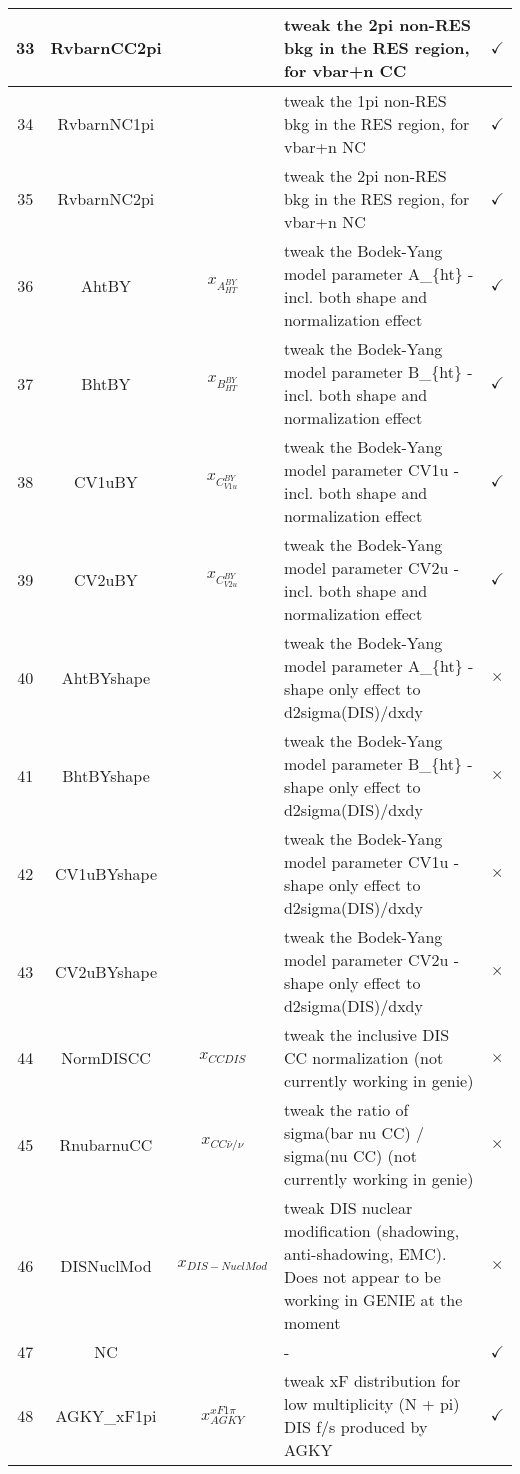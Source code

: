 \begin{longtable}{|c|c|c|X|c|}
\hline
33 & RvbarnCC2pi && tweak the 2pi non-RES bkg in the RES region, for vbar+n CC & $\checkmark$\\
\hline
34 & RvbarnNC1pi && tweak the 1pi non-RES bkg in the RES region, for vbar+n NC & $\checkmark$\\
\hline
35 & RvbarnNC2pi && tweak the 2pi non-RES bkg in the RES region, for vbar+n NC & $\checkmark$\\
\hline \hline
36 & AhtBY &$x_{A_{HT}^{BY}}$& tweak the Bodek-Yang model parameter A\_\{ht\} - incl. both shape and normalization effect & $\checkmark$\\
\hline
37 & BhtBY &$x_{B_{HT}^{BY}}$& tweak the Bodek-Yang model parameter B\_\{ht\} - incl. both shape and normalization effect & $\checkmark$\\
\hline
38 & CV1uBY &$x_{C_{V1u}^{BY}}$& tweak the Bodek-Yang model parameter CV1u - incl. both shape and normalization effect & $\checkmark$\\
\hline
39 & CV2uBY &$x_{C_{V2u}^{BY}}$& tweak the Bodek-Yang model parameter CV2u - incl. both shape and normalization effect & $\checkmark$\\
\hline
40 & AhtBYshape && tweak the Bodek-Yang model parameter A\_\{ht\} - shape only effect to d2sigma(DIS)/dxdy & $\times$\\
\hline
41 & BhtBYshape && tweak the Bodek-Yang model parameter B\_\{ht\} - shape only effect to d2sigma(DIS)/dxdy & $\times$\\
\hline
42 & CV1uBYshape && tweak the Bodek-Yang model parameter CV1u - shape only effect to d2sigma(DIS)/dxdy & $\times$\\
\hline
43 & CV2uBYshape && tweak the Bodek-Yang model parameter CV2u - shape only effect to d2sigma(DIS)/dxdy & $\times$\\
\hline
44 & NormDISCC &$x_{CCDIS}$& tweak the inclusive DIS CC normalization (not currently working in genie) & $\times$\\
\hline
45 & RnubarnuCC &$x_{CC\bar{\nu}/\nu}$& tweak the ratio of sigma(bar nu CC) / sigma(nu CC) (not currently working in genie) & $\times$\\
\hline
46 & DISNuclMod &$x_{DIS-NuclMod}$& tweak DIS nuclear modification (shadowing, anti-shadowing, EMC).  Does not appear to be working in GENIE at the moment & $\times$\\
\hline \hline
47 & NC && - & $\checkmark$\\
\hline \hline
48 & AGKY\_xF1pi &$x_{AGKY}^{xF1\pi}$& tweak xF distribution for low multiplicity (N + pi) DIS f/s produced by AGKY & $\checkmark$\\

\end{longtable}
